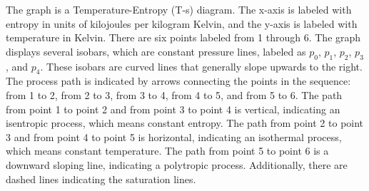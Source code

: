 The graph is a Temperature-Entropy (T-s) diagram. The x-axis is labeled with entropy in units of kilojoules per kilogram Kelvin, and the y-axis is labeled with temperature in Kelvin. There are six points labeled from 1 through 6. The graph displays several isobars, which are constant pressure lines, labeled as \( p_0 \), \( p_1 \), \( p_2 \), \( p_3 \), and \( p_4 \). These isobars are curved lines that generally slope upwards to the right. The process path is indicated by arrows connecting the points in the sequence: from 1 to 2, from 2 to 3, from 3 to 4, from 4 to 5, and from 5 to 6. The path from point 1 to point 2 and from point 3 to point 4 is vertical, indicating an isentropic process, which means constant entropy. The path from point 2 to point 3 and from point 4 to point 5 is horizontal, indicating an isothermal process, which means constant temperature. The path from point 5 to point 6 is a downward sloping line, indicating a polytropic process. Additionally, there are dashed lines indicating the saturation lines.